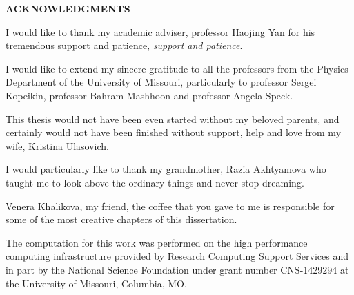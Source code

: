 \newpage
{}
\setcounter{page}{2}

\centerline{\bf \large ACKNOWLEDGMENTS}
\vspace{10mm} %

I would like to thank my academic adviser, professor Haojing Yan for his tremendous support and patience, \textit{support and patience}.

I would like to extend my sincere gratitude to all the professors from the Physics Department of the University of Missouri, particularly to professor Sergei Kopeikin, professor Bahram Mashhoon and professor Angela Speck.

This thesis would not have been even started without my beloved parents, and certainly would not have been finished without support, help and love from my wife, Kristina Ulasovich.

I would particularly like to thank my grandmother, Razia Akhtyamova who taught me to look above the ordinary things and never stop dreaming.

Venera Khalikova, my friend, the coffee that you gave to me is responsible for some of the most creative chapters of this dissertation.

The computation for this work was performed on the high performance computing infrastructure provided by Research Computing Support Services and in part by the National Science Foundation under grant number CNS-1429294 at the University of Missouri, Columbia, MO. 
